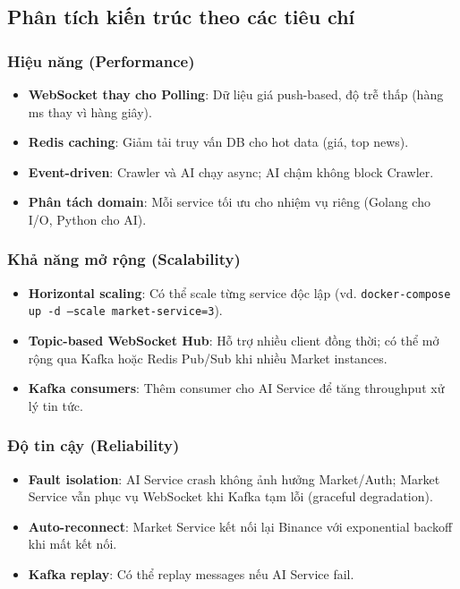 \subsection{Phân tích kiến trúc theo các tiêu chí}

\subsubsection{Hiệu năng (Performance)}

\begin{itemize}
    \item \textbf{WebSocket thay cho Polling}: Dữ liệu giá push-based, độ trễ thấp (hàng ms thay vì hàng giây).
    \item \textbf{Redis caching}: Giảm tải truy vấn DB cho hot data (giá, top news).
    \item \textbf{Event-driven}: Crawler và AI chạy async; AI chậm không block Crawler.
    \item \textbf{Phân tách domain}: Mỗi service tối ưu cho nhiệm vụ riêng (Golang cho I/O, Python cho AI).
\end{itemize}

\subsubsection{Khả năng mở rộng (Scalability)}

\begin{itemize}
    \item \textbf{Horizontal scaling}: Có thể scale từng service độc lập (vd. \texttt{docker-compose up -d --scale market-service=3}).
    \item \textbf{Topic-based WebSocket Hub}: Hỗ trợ nhiều client đồng thời; có thể mở rộng qua Kafka hoặc Redis Pub/Sub khi nhiều Market instances.
    \item \textbf{Kafka consumers}: Thêm consumer cho AI Service để tăng throughput xử lý tin tức.
\end{itemize}

\subsubsection{Độ tin cậy (Reliability)}

\begin{itemize}
    \item \textbf{Fault isolation}: AI Service crash không ảnh hưởng Market/Auth; Market Service vẫn phục vụ WebSocket khi Kafka tạm lỗi (graceful degradation).
    \item \textbf{Auto-reconnect}: Market Service kết nối lại Binance với exponential backoff khi mất kết nối.
    \item \textbf{Kafka replay}: Có thể replay messages nếu AI Service fail.
\end{itemize}

